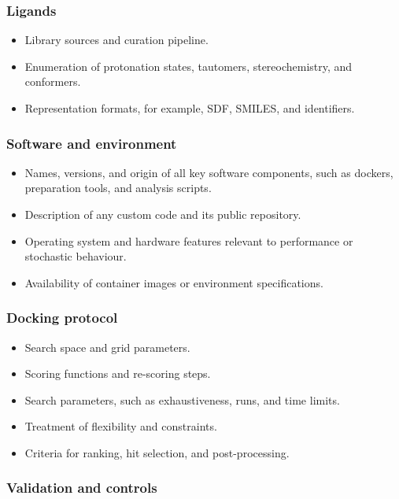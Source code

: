 \documentclass[12pt]{article}
\begin{document}
\subsubsection{Ligands}

\begin{itemize}
  \item Library sources and curation pipeline.
  \item Enumeration of protonation states, tautomers, stereochemistry, and conformers.
  \item Representation formats, for example, SDF, SMILES, and identifiers.
\end{itemize}

\subsubsection{Software and environment}

\begin{itemize}
  \item Names, versions, and origin of all key software components, such as dockers, preparation tools, and analysis scripts.
  \item Description of any custom code and its public repository.
  \item Operating system and hardware features relevant to performance or stochastic behaviour.
  \item Availability of container images or environment specifications.
\end{itemize}

\subsubsection{Docking protocol}

\begin{itemize}
  \item Search space and grid parameters.
  \item Scoring functions and re-scoring steps.
  \item Search parameters, such as exhaustiveness, runs, and time limits.
  \item Treatment of flexibility and constraints.
  \item Criteria for ranking, hit selection, and post-processing.
\end{itemize}

\subsubsection{Validation and controls}
\end{document}
